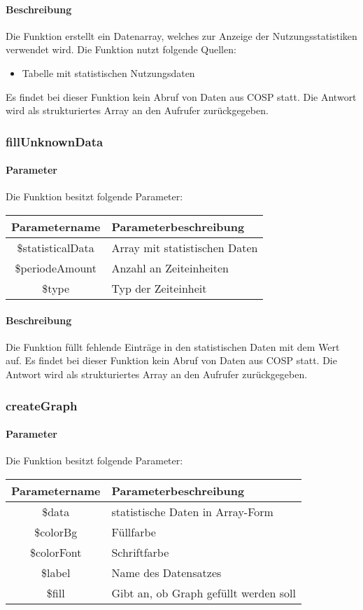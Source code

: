 \paragraph{Beschreibung} Die Funktion erstellt ein Datenarray, welches zur Anzeige der Nutzungsstatistiken verwendet wird. Die Funktion nutzt folgende Quellen:
\begin{itemize}
	\item Tabelle mit statistischen Nutzungsdaten
\end{itemize}
Es findet bei dieser Funktion kein Abruf von Daten aus {\glqq COSP\grqq} statt. Die Antwort wird als strukturiertes Array an den Aufrufer zurückgegeben.
\subsubsection{fillUnknownData}
\paragraph{Parameter} Die Funktion besitzt folgende Parameter:
\begin{table}[H]
	\begin{tabular}{|c|p{11cm}|}
		\hline
		\textbf{Parametername} & \textbf{Parameterbeschreibung} \\ \hline
		\$statisticalData & Array mit statistischen Daten \\ \hline
		\$periodeAmount   & Anzahl an Zeiteinheiten \\ \hline
		\$type            & Typ der Zeiteinheit \\ \hline
	\end{tabular}
\end{table}
\paragraph{Beschreibung} Die Funktion füllt fehlende Einträge in den statistischen Daten mit dem Wert {\grqq} auf. Es findet bei dieser Funktion kein Abruf von Daten aus {\glqq COSP\grqq} statt. Die Antwort wird als strukturiertes Array an den Aufrufer zurückgegeben.
\subsubsection{createGraph}
\paragraph{Parameter} Die Funktion besitzt folgende Parameter:
\begin{table}[H]
	\begin{tabular}{|c|p{11cm}|}
		\hline
		\textbf{Parametername} & \textbf{Parameterbeschreibung} \\ \hline
		\$data      & statistische Daten in Array-Form \\ \hline
		\$colorBg   & Füllfarbe \\ \hline
		\$colorFont & Schriftfarbe \\ \hline
		\$label     & Name des Datensatzes \\ \hline
		\$fill      & Gibt an, ob Graph gefüllt werden soll \\ \hline
	\end{tabular}
\end{table}
